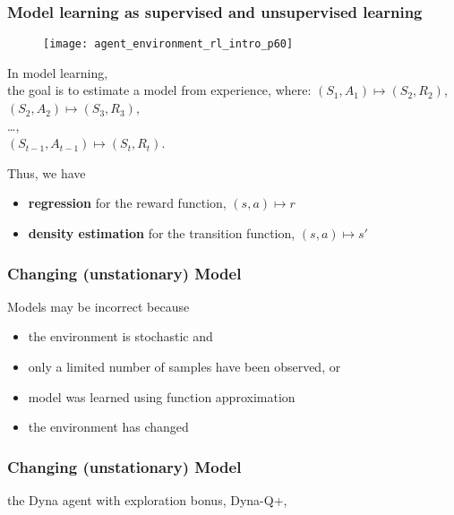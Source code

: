 \begin{frame}
\frametitle{Model learning as supervised and unsupervised learning}
\begin{figure}
    \centering
    \texttt{[image: agent\_environment\_rl\_intro\_p60]}
\end{figure}

In model learning, \\
the goal is to estimate a model from experience, where:
$(S_1, A_1) \mapsto (S_2, R_2)$, \\
$(S_2, A_2) \mapsto (S_3, R_3)$,\\
\ldots,\\
$(S_{t-1}, A_{t-1}) \mapsto (S_t, R_t)$.
\vspace{2mm}
\pause

Thus, we have
\begin{itemize}
\item \textbf{regression} for the reward function, $(s, a) \mapsto r$
\item \textbf{density estimation} for the transition function, $(s, a) \mapsto s'$
\end{itemize}

\end{frame}

\begin{frame}
\frametitle{Changing (unstationary) Model}

Models may be incorrect because
\begin{itemize}
    \item the environment is stochastic and
    \item only a limited number of samples have been observed, or
    \item model was learned using function approximation
    \item the environment has changed
\end{itemize}

\end{frame}

\begin{frame}
\frametitle{Changing (unstationary) Model}

the Dyna agent with exploration bonus, Dyna-Q+,

\end{frame}

